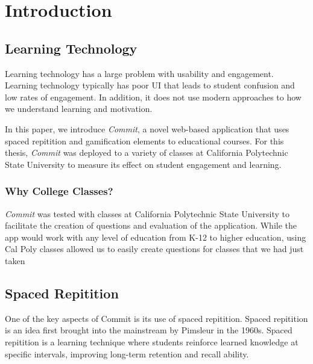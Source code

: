 \chapter{Introduction}

\section{Learning Technology}
\par Learning technology has a large problem with usability and engagement. Learning technology typically has poor UI that leads to student confusion and low rates of engagement. In addition, it does not use modern approaches to how we understand learning and motivation.

\par In this paper, we introduce \textit{Commit}, a novel web-based application that uses spaced repitition and gamification elements to educational courses. For this thesis, \textit{Commit} was deployed to a variety of classes at California Polytechnic State University to measure its effect on student engagement and learning.

\subsection{Why College Classes?}
\par \textit{Commit} was tested with classes at California Polytechnic State University to facilitate the creation of questions and evaluation of the application. While the app would work with any level of education from K-12 to higher education, using Cal Poly classes allowed us to easily create questions for classes that we had just taken


\section{Spaced Repitition}
\par One of the key aspects of Commit is its use of spaced repitition. Spaced repitition is an idea first brought into the mainstream by Pimsleur in the 1960s. Spaced repitition is a learning technique where students reinforce learned knowledge at specific intervals, improving long-term retention and recall ability.

